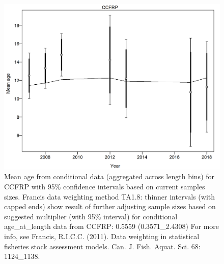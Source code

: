 \documentclass[12pt,]{article}
\begin{document}
\begin{figure}
\centering
\includegraphics{./r4ss/plots_mod1/comp_condAALfit_data_weighting_TA1.8_condAgeCCFRP.png}
\caption{Mean age from conditional data (aggregated across length bins)
for CCFRP with 95\% confidence intervals based on current samples sizes.
Francis data weighting method TA1.8: thinner intervals (with capped
ends) show result of further adjusting sample sizes based on suggested
multiplier (with 95\% interval) for conditional age\_at\_length data
from CCFRP: 0.5559 (0.3571\_2.4308) For more info, see Francis, R.I.C.C.
(2011). Data weighting in statistical fisheries stock assessment models.
Can. J. Fish. Aquat. Sci. 68: 1124\_1138.
\label{fig:mod1_12_comp_condAALfit_data_weighting_TA1.8_condAgeCCFRP}}
\end{figure}
\end{document}
